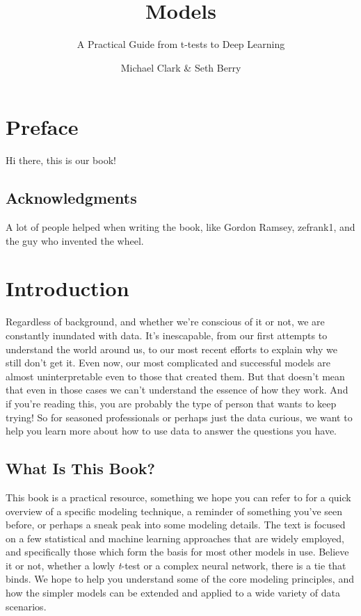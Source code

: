 \documentclass[
  letterpaper,
]{krantz}
\title{Models}
\subtitle{A Practical Guide from t-tests to Deep Learning}
\author{Michael Clark \& Seth Berry}
\date{}
\renewcommand*\contentsname{Table of contents}
\newcommand\contentsname{Table of contents}
\begin{document}
\maketitle
\renewcommand*\contentsname{Contents}
{
\hypersetup{linkcolor=}
\setcounter{tocdepth}{2}
\tableofcontents
}

\chapter*{Preface}\label{preface}


Hi there, this is our book!

\section*{Acknowledgments}\label{acknowledgments}


A lot of people helped when writing the book, like Gordon Ramsey,
zefrank1, and the guy who invented the wheel.


\chapter{Introduction}\label{introduction}

Regardless of background, and whether we're conscious of it or not, we
are constantly inundated with data. It's inescapable, from our first
attempts to understand the world around us, to our most recent efforts
to explain why we still don't get it. Even now, our most complicated and
successful models are almost uninterpretable even to those that created
them. But that doesn't mean that even in those cases we can't understand
the essence of how they work. And if you're reading this, you are
probably the type of person that wants to keep trying! So for seasoned
professionals or perhaps just the data curious, we want to help you
learn more about how to use data to answer the questions you have.

\section{What Is This Book?}\label{what-is-this-book}

This book is a practical resource, something we hope you can refer to
for a quick overview of a specific modeling technique, a reminder of
something you've seen before, or perhaps a sneak peak into some modeling
details. The text is focused on a few statistical and machine learning
approaches that are widely employed, and specifically those which form
the basis for most other models in use. Believe it or not, whether a
lowly \emph{t}-test or a complex neural network, there is a tie that
binds. We hope to help you understand some of the core modeling
principles, and how the simpler models can be extended and applied to a
wide variety of data scenarios.
\end{document}

